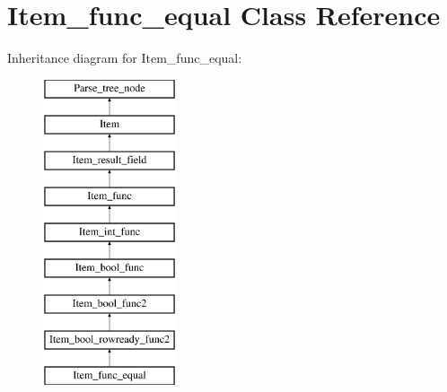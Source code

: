 \hypertarget{classItem__func__equal}{}\section{Item\+\_\+func\+\_\+equal Class Reference}
\label{classItem__func__equal}
Inheritance diagram for Item\+\_\+func\+\_\+equal\+:\begin{figure}[H]
\begin{center}
\leavevmode
\includegraphics[height=9.000000cm]{classItem__func__equal}
\end{center}
\end{figure}

